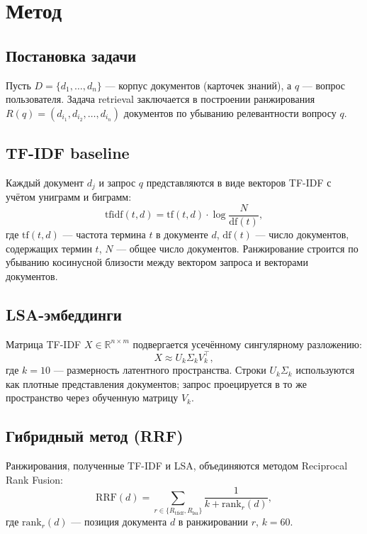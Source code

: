 \documentclass[nonacm, sigconf]{acmart}
\begin{document}
\section{Метод}

\subsection{Постановка задачи}

Пусть $D = \{d_1, \dots, d_n\}$ — корпус документов (карточек знаний), а $q$ — вопрос пользователя. Задача retrieval заключается в построении ранжирования $R(q) = (d_{i_1}, d_{i_2}, \dots, d_{i_n})$ документов по убыванию релевантности вопросу $q$.

\subsection{TF-IDF baseline}

Каждый документ $d_j$ и запрос $q$ представляются в виде векторов TF-IDF с учётом униграмм и биграмм:
\begin{equation}
\text{tfidf}(t, d) = \text{tf}(t, d) \cdot \log\frac{N}{\text{df}(t)},
\end{equation}
где $\text{tf}(t, d)$ — частота термина $t$ в документе $d$, $\text{df}(t)$ — число документов, содержащих термин $t$, $N$ — общее число документов. Ранжирование строится по убыванию косинусной близости между вектором запроса и векторами документов.

\subsection{LSA-эмбеддинги}

Матрица TF-IDF $X \in \mathbb{R}^{n \times m}$ подвергается усечённому сингулярному разложению:
\begin{equation}
X \approx U_k \Sigma_k V_k^\top,
\end{equation}
где $k=10$ — размерность латентного пространства. Строки $U_k \Sigma_k$ используются как плотные представления документов; запрос проецируется в то же пространство через обученную матрицу $V_k$.

\subsection{Гибридный метод (RRF)}

Ранжирования, полученные TF-IDF и LSA, объединяются методом Reciprocal Rank Fusion:
\begin{equation}
\text{RRF}(d) = \sum_{r \in \{R_{\text{tfidf}}, R_{\text{lsa}}\}} \frac{1}{k + \text{rank}_r(d)},
\end{equation}
где $\text{rank}_r(d)$ — позиция документа $d$ в ранжировании $r$, $k=60$.
\end{document}
